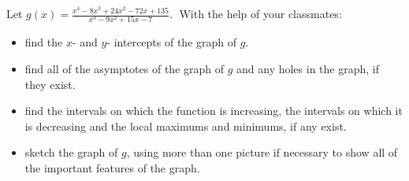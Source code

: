 \documentclass{ximera}
\begin{document}
\begin{problem}
\begin{question}
\end{question}

\end{problem}

\begin{question}
  Let $g(x) = \displaystyle \frac{x^{4} - 8x^{3} + 24x^{2} - 72x + 135}{x^{3} - 9x^{2} + 15x - 7}.\;$  With the help of your classmates:

  \begin{itemize}
    \item  find the $x$- and $y$- intercepts of the graph of $g$.
    \item   find all of the asymptotes of the graph of $g$ and any holes in the graph, if they exist.
    \item find the intervals on which the function is increasing, the intervals on which it is decreasing and the local maximums and minimums, if any exist.
    \item sketch the graph of $g$, using more than one picture if necessary to show all of the important features of the graph.
  \end{itemize}
\end{question} %
\end{document}
